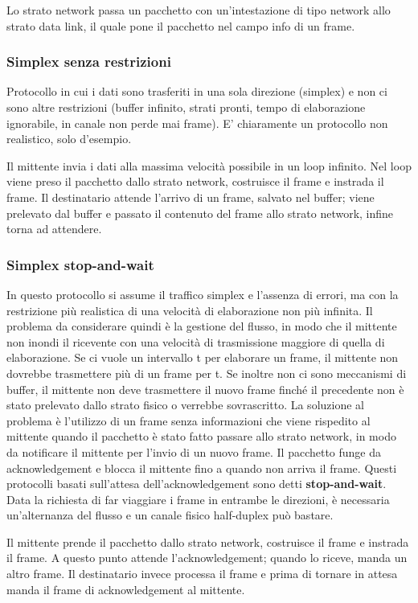 Lo strato network passa un pacchetto con un'intestazione di tipo network allo strato data link, il quale pone il pacchetto nel campo info di un frame.

\subsubsection{Simplex senza restrizioni}
Protocollo in cui i dati sono trasferiti in una sola direzione (simplex) e non ci sono altre restrizioni
(buffer infinito, strati pronti, tempo di elaborazione ignorabile, in canale non perde mai frame).
E' chiaramente un protocollo non realistico, solo d'esempio.

Il mittente invia i dati alla massima velocità possibile in un loop infinito.
Nel loop viene preso il pacchetto dallo strato network, costruisce il frame e instrada il frame. 
Il destinatario attende l'arrivo di un frame, salvato nel buffer;
viene prelevato dal buffer e passato il contenuto del frame allo strato network, infine torna ad attendere.

\subsubsection{Simplex stop-and-wait}
In questo protocollo si assume il traffico simplex e l'assenza di errori, ma con la restrizione più realistica di una velocità di elaborazione non più infinita.
Il problema da considerare quindi è la gestione del flusso, in modo che il mittente non inondi il ricevente con una velocità di trasmissione maggiore di quella di elaborazione.
Se ci vuole un intervallo t per elaborare un frame, il mittente non dovrebbe trasmettere più di un frame per t.
Se inoltre non ci sono meccanismi di buffer, il mittente non deve trasmettere il nuovo frame finché il precedente non è stato prelevato dallo strato fisico o verrebbe sovrascritto.
La soluzione al problema è l'utilizzo di un frame senza informazioni che viene rispedito al mittente quando il pacchetto è stato fatto passare allo strato network,
in modo da notificare il mittente per l'invio di un nuovo frame.
Il pacchetto funge da acknowledgement e blocca il mittente fino a quando non arriva il frame.
Questi protocolli basati sull'attesa dell'acknowledgement sono detti \textbf{stop-and-wait}.
Data la richiesta di far viaggiare i frame in entrambe le direzioni, è necessaria un'alternanza del flusso e un canale fisico half-duplex può bastare.

Il mittente prende il pacchetto dallo strato network, costruisce il frame e instrada il frame. 
A questo punto attende l'acknowledgement; quando lo riceve, manda un altro frame.
Il destinatario invece processa il frame e prima di tornare in attesa manda il frame di acknowledgement al mittente.

